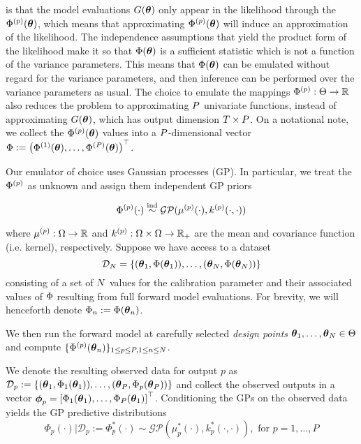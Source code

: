 \documentclass[12pt]{article}
\begin{document}
is that the model evaluations $G(\boldsymbol{\theta})$ only appear in the likelihood through the $\Phi^{(p)}(\boldsymbol{\theta})$, which means that approximating $\Phi^{(p)}(\boldsymbol{\theta})$ will induce an approximation of the likelihood. The independence assumptions 
that yield the product form of the likelihood make it so that $\Phi(\boldsymbol{\theta})$ is a sufficient statistic which is not a function of the variance parameters. This means that $\Phi(\boldsymbol{\theta})$ can be emulated without regard for the variance parameters, 
and then inference can be performed over the variance parameters as usual. The choice to emulate the mappings $\Phi^{(p)}: \Theta \to \mathbb{R}$ also reduces the problem to 
approximating $P$ univariate functions, instead of approximating $G(\boldsymbol{\theta})$, which has output dimension $T \times P$. On a notational note, we collect the $\Phi^{(p)}(\boldsymbol{\theta})$ values into a $P$-dimensional 
vector $\Phi := \begin{pmatrix} \Phi^{(1)}(\boldsymbol{\theta}), \dots, \Phi^{(P)}(\boldsymbol{\theta}) \end{pmatrix}^\top$.  

Our emulator of choice uses Gaussian processes (GP). In particular, we treat the $\Phi^{(p)}$ as unknown and assign them independent GP priors

\[\Phi^{(p)}(\cdot) \overset{\text{ind}}{\sim} \mathcal{GP}(\mu^{(p)}(\cdot), k^{(p)}(\cdot, \cdot))\] 

where $\mu^{(p)}: \Omega \to \mathbb{R}$ and $k^{(p)}: \Omega \times \Omega \to \mathbb{R}_+$ are the mean and covariance function (i.e. kernel), respectively. 
Suppose we have access to a dataset 
\[\mathcal{D}_{N} = \left\{(\boldsymbol{\theta}_1, \Phi(\boldsymbol{\theta}_1)), \dots, (\boldsymbol{\theta}_{N}, \Phi(\boldsymbol{\theta}_{N})) \right\}\]
consisting of a set of $N$ values for the calibration parameter and their associated values of $\Phi$ resulting from full forward model evaluations. For brevity, we will henceforth denote 
$\Phi_{n} := \Phi(\boldsymbol{\theta}_{n})$. 

We then run the forward model at carefully selected \textit{design points} $\boldsymbol{\theta}_1, \dots, \boldsymbol{\theta}_N \in \Theta$ and compute $\{\Phi^{(p)}(\boldsymbol{\theta}_{n})\}_{1 \leq p \leq P, 1 \leq n \leq N}$. 

We denote the resulting observed data for output $p$ as 
$\mathcal{D}_p := \left\{(\boldsymbol{\theta}_1, \Phi_1(\boldsymbol{\theta}_1)), \dots, (\boldsymbol{\theta}_P, \Phi_p(\boldsymbol{\theta}_P))  \right\}$ and collect the observed outputs in a vector 
$\boldsymbol{\phi}_p = \left[\Phi_1(\boldsymbol{\theta}_1), \dots, \Phi_P(\boldsymbol{\theta}_1) \right]^{\top}$. Conditioning the GPs on the observed data yields the GP predictive distributions 
\[\Phi_p(\cdot)|\mathcal{D}_p := \Phi_p^*(\cdot) \sim \mathcal{GP}(\mu^*_p(\cdot), k_p^*(\cdot, \cdot)), \text{ for } p = 1, \dots, P\]
\end{document}
